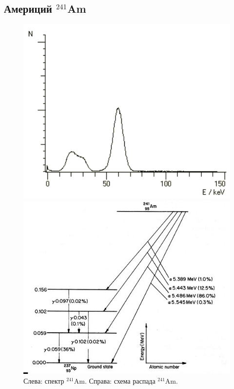 \documentclass[12pt,a4paper]{article}
\begin{document}
	\subsection*{Америций $^{241}$Am}
	
	\begin{figure}[H]
		\centering
		\begin{minipage}{0.5\textwidth}
			\centering
			\includegraphics[width=0.9\linewidth]{res/am_spectre.png}
		\end{minipage}%
		\begin{minipage}{0.5\textwidth}
			\centering
			\includegraphics[width=1.0\linewidth]{res/am_scheme.jpg}
		\end{minipage}
		\caption{\centering
			Слева: спектр $^{241}$Am.
			Справа: схема распада $^{241}$Am.}
		\label{fig:am_scheme}
	\end{figure}
	
\end{document}

